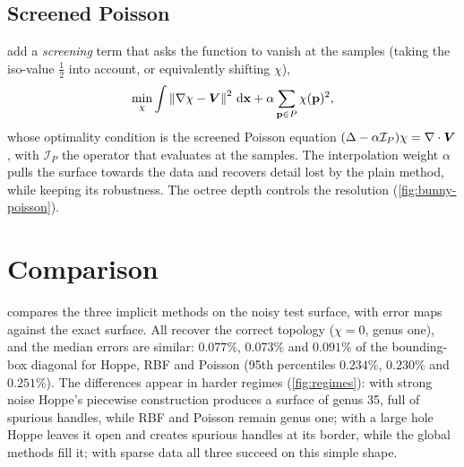 \subsection{Screened Poisson}

 add a \emph{screening} term that asks the function to vanish at the samples
(taking the iso-value $\tfrac12$ into account, or equivalently shifting $\chi$),
\begin{equation}
\min_\chi\int\left\lVert \nabla\chi-\bm V\right\rVert^2\,\mathrm{d}\mathbf{x}+\alpha\sum_{\mathbf{p}\in P}\chi(\mathbf{p})^2 ,
\end{equation}
whose optimality condition is the screened Poisson equation $(\Delta-\alpha\mathcal I_P)\chi=\nabla\cdot\bm V$,
with $\mathcal I_P$ the operator that evaluates at the samples. The interpolation weight $\alpha$
pulls the surface towards the data and recovers detail lost by the plain method, while keeping
its robustness. The octree depth controls the resolution (\cref{fig:bunny-poisson}).


\section{Comparison}

 compares the three implicit methods on the noisy test surface, with error maps
against the exact surface. All recover the correct topology ($\chi=0$, genus one), and the median
errors are similar: $0.077\%$, $0.073\%$ and $0.091\%$ of the bounding-box diagonal for Hoppe, RBF
and Poisson (95th percentiles $0.234\%$, $0.230\%$ and $0.251\%$). The differences appear in harder
regimes (\cref{fig:regimes}): with strong noise Hoppe's piecewise construction produces a surface of
genus 35, full of spurious handles, while RBF and Poisson remain genus one; with a large hole Hoppe
leaves it open and creates spurious handles at its border, while the global methods fill it; with
sparse data all three succeed on this simple shape.


